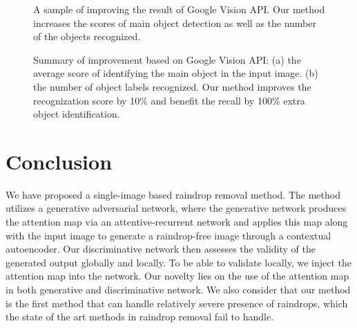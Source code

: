 \documentclass[10pt,twocolumn,letterpaper]{article}
\begin{document}
\begin{figure}
\centering
{}\vspace{3mm}
\caption{A sample of improving the result of Google Vision API. Our method increases the scores of main object detection as well as the number of the objects recognized.}
\label{fig:app1}
\end{figure}

\vspace{5mm}

\begin{figure}
\centering
{}
\caption{Summary of improvement based on Google Vision API: (a) the average score of identifying the main object in the input image. (b)  the number of object labels recognized. Our method improves the recognization score by 10$\%$ and benefit the recall by 100$\%$ extra object identification.} 
\label{fig:app2}
\end{figure}

\section{Conclusion}
\label{sec:conclusion}
We have proposed a single-image based raindrop removal method. The method utilizes a generative adversarial network, where the generative network  produces the attention map via an attentive-recurrent network and applies this map along with the input image to generate a raindrop-free image through a contextual autoencoder. Our discriminative network then assesses the validity of the generated output globally and locally. To be able to validate locally, we inject the attention map into the network. Our novelty lies on the use of the attention map in both generative and discriminative network. We also consider that our method is the first method that can handle relatively severe presence of raindrops, which the state of the art methods in raindrop removal fail to handle.



\end{document}
